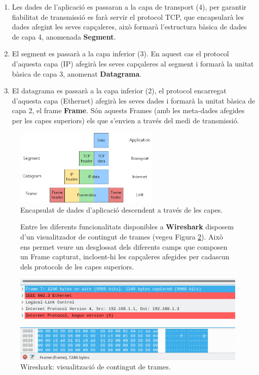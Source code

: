 \documentclass[12pt,a4paper]{article}
\begin{document}
\begin{enumerate}
 \item Les dades de l'aplicació es passaran a la capa de transport (4), per garantir fiabilitat de transmissió es farà servir el protocol TCP, que encapsularà les dades afegint les seves capçaleres, això formarà l'estructura bàsica de dades de capa 4, anomenada \textbf{Segment}. 
 \item El segment es passarà a la capa inferior (3). En aquest cas el protocol d'aquesta capa (IP) afegirà les seves capçaleres al segment i formarà la unitat bàsica de capa 3, anomenat \textbf{Datagrama}.
 \item El datagrama es passarà a la capa inferior (2), el protocol encarregat d'aquesta capa (Ethernet) afegirà les seves dades i formarà la unitat bàsica de capa 2, el frame \textbf{Frame}.  Són aquests Frames (amb les meta-dades afegides per les capes superiors) els que s'envien a través del medi de transmissió. 
  
\end{enumerate}

\begin{figure}[!ht]
  \begin{center}
    \includegraphics[width=0.615\textwidth]{encapsulation}
     \caption{Encapsulat de dades d'aplicació descendent a través de les capes.}
    \label{encapsulation}
  \end{center}
\end{figure}

\newpage
\begin{figure}[!ht]
Entre les diferents funcionalitats disponibles a \textbf{Wireshark} disposem d'un visualitzador de contingut de trames (vegeu Figura \ref{wireshark-frame}). Això ens permet veure un desglossat dels diferents camps que composen un Frame capturat, incloent-hi les capçaleres afegides per cadascun dels protocols de les capes superiors.
  \begin{center}
    \includegraphics[width=1\textwidth]{wireshark-frame}
    \caption{Wireshark: visualització de contingut de trames.}
    \label{wireshark-frame}
  \end{center}
\end{figure}
\end{document}
